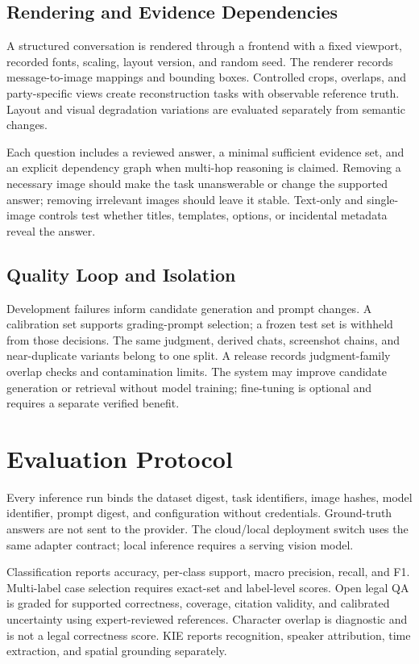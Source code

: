 \documentclass[11pt]{article}
\begin{document}
\subsection{Rendering and Evidence Dependencies}
A structured conversation is rendered through a frontend with a fixed viewport, recorded fonts, scaling, layout version, and random seed. The renderer records message-to-image mappings and bounding boxes. Controlled crops, overlaps, and party-specific views create reconstruction tasks with observable reference truth. Layout and visual degradation variations are evaluated separately from semantic changes.

Each question includes a reviewed answer, a minimal sufficient evidence set, and an explicit dependency graph when multi-hop reasoning is claimed. Removing a necessary image should make the task unanswerable or change the supported answer; removing irrelevant images should leave it stable. Text-only and single-image controls test whether titles, templates, options, or incidental metadata reveal the answer.

\subsection{Quality Loop and Isolation}
Development failures inform candidate generation and prompt changes. A calibration set supports grading-prompt selection; a frozen test set is withheld from those decisions. The same judgment, derived chats, screenshot chains, and near-duplicate variants belong to one split. A release records judgment-family overlap checks and contamination limits. The system may improve candidate generation or retrieval without model training; fine-tuning is optional and requires a separate verified benefit.

\section{Evaluation Protocol}
Every inference run binds the dataset digest, task identifiers, image hashes, model identifier, prompt digest, and configuration without credentials. Ground-truth answers are not sent to the provider. The cloud/local deployment switch uses the same adapter contract; local inference requires a serving vision model.

Classification reports accuracy, per-class support, macro precision, recall, and F1. Multi-label case selection requires exact-set and label-level scores. Open legal QA is graded for supported correctness, coverage, citation validity, and calibrated uncertainty using expert-reviewed references. Character overlap is diagnostic and is not a legal correctness score. KIE reports recognition, speaker attribution, time extraction, and spatial grounding separately.
\end{document}
